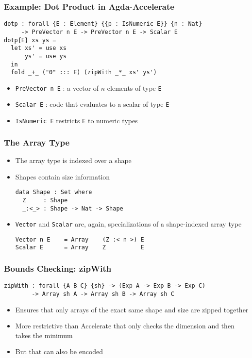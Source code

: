 \documentclass{beamer}
\begin{document}
\begin{frame}[fragile]
  \frametitle{Example: Dot Product in Agda-Accelerate}
  \vspace{-\baselineskip}
\begin{verbatim}
dotp : forall {E : Element} {{p : IsNumeric E}} {n : Nat}
     -> PreVector n E -> PreVector n E -> Scalar E
dotp{E} xs ys = 
  let xs' = use xs
      ys' = use ys
  in
  fold _+_ ("0" ::: E) (zipWith _*_ xs' ys')
\end{verbatim}
  \begin{itemize}
  \item \texttt{PreVector n E} : a vector of $n$ elements of
    type \texttt{E}
  \item \texttt{Scalar E} : code that evaluates to a scalar of type \texttt{E}
  \item \texttt{IsNumeric E} restricts \texttt{E} to numeric types
  \end{itemize}
\end{frame}
\begin{frame}[fragile]
  \frametitle{The Array Type}
  \begin{itemize}
  \item The array type is indexed over a shape
  \item Shapes contain size information
\begin{verbatim}
data Shape : Set where
  Z     : Shape
  _:<_> : Shape -> Nat -> Shape
\end{verbatim}
  \item \texttt{Vector} and \texttt{Scalar} are, again,
    specializations of a shape-indexed array type
\begin{verbatim}
Vector n E    = Array    (Z :< n >) E
Scalar E      = Array    Z          E
\end{verbatim}
  \end{itemize}
\end{frame}
\begin{frame}[fragile]
  \frametitle{Bounds Checking: zipWith}
\begin{verbatim}
zipWith : forall {A B C} {sh} -> (Exp A -> Exp B -> Exp C)
        -> Array sh A -> Array sh B -> Array sh C
\end{verbatim}
  \begin{itemize}
  \item Ensures that only arrays of the exact same shape and size are
    zipped together
  \item More restrictive than Accelerate that only checks the
    dimension and then takes the minimum
  \item But that can also be encoded
  \end{itemize}
\end{frame}
\end{document}
